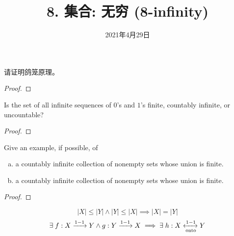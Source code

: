 \documentclass[a4paper, justified]{tufte-handout}
\title{8. 集合: 无穷 (8-infinity)}
\date{2021年4月29日}
\begin{document}
\maketitle
\noplagiarism %
\begin{abstract}
\end{abstract}
\beginrequired

\begin{problem}
  请证明鸽笼原理。
\end{problem}

\begin{proof}
\end{proof}

\begin{problem}
  Is the set of all infinite sequences of $0$'s and $1$'s finite,
  countably infinite, or uncountable?
\end{problem}

\begin{proof}
\end{proof}

\begin{problem}
  Give an example, if possible, of
  \begin{enumerate}[(a)]
    \item a countably infinite collection of  nonempty sets whose union is finite.
    \item a countably infinite collection of nonempty sets whose union is finite.
  \end{enumerate}
\end{problem}

\begin{proof}
\end{proof}

\begin{problem}
  \begin{theorem}
    \[
      |X| \le |Y| \land |Y| \le |X| \implies |X| = |Y|
    \]
    \[
      \exists\; f: X \xrightarrow{1-1} Y \land g: Y \xrightarrow{1-1} X
      \implies \exists\; h: X \xleftrightarrow[\text{onto}]{1-1} Y
    \]
  \end{theorem}

  {\href{https://en.wikipedia.org/wiki/Schr\%C3\%B6der\%E2\%80\%93Bernstein\_theorem}{}}
\end{problem}
\end{document}
